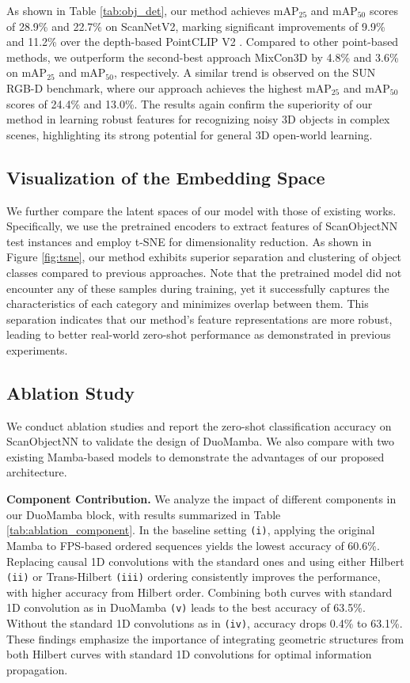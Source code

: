 As shown in Table \ref{tab:obj_det}, our method achieves mAP$_{25}$ and mAP$_{50}$ scores of 28.9\% and 22.7\% on ScanNetV2, marking significant improvements of 9.9\% and 11.2\% over the depth-based PointCLIP V2 \cite{pointclipv2}. Compared to other point-based methods, we outperform the second-best approach MixCon3D \cite{mixcon3d} by 4.8\% and 3.6\% on mAP$_{25}$ and mAP$_{50}$, respectively. A similar trend is observed on the SUN RGB-D benchmark, where our approach achieves the highest mAP$_{25}$ and mAP$_{50}$ scores of 24.4\% and 13.0\%.
The results again confirm the superiority of our method in learning robust features for recognizing noisy 3D objects in complex scenes, highlighting its strong potential for general 3D open-world learning.

\subsection{Visualization of the Embedding Space}
We further compare the latent spaces of our model with those of existing works. Specifically, we use the pretrained encoders to extract features of ScanObjectNN \cite{scanobjectnn} test instances and employ t-SNE \cite{tsne} for dimensionality reduction. As shown in Figure \ref{fig:tsne}, our method exhibits superior separation and clustering of object classes compared to previous approaches. Note that the pretrained model did not encounter any of these samples during training, yet it successfully captures the characteristics of each category and minimizes overlap between them. This separation indicates that our method’s feature representations are more robust, leading to better real-world zero-shot performance as demonstrated in previous experiments. 
\subsection{Ablation Study}
\label{subsec:ablation}
We conduct ablation studies and report the zero-shot classification accuracy on ScanObjectNN \cite{scanobjectnn} to validate the design of DuoMamba.
We also compare with two existing Mamba-based models to demonstrate the advantages of our proposed architecture.

\vspace{1mm} 
\noindent\textbf{Component Contribution.} We analyze the impact of different components in our DuoMamba block, with results summarized in Table \ref{tab:ablation_component}. In the baseline setting \texttt{(i)}, applying the original Mamba \cite{mamba} to FPS-based ordered sequences yields the lowest accuracy of 60.6\%. Replacing causal 1D convolutions with the standard ones and using either Hilbert \texttt{(ii)} or Trans-Hilbert \texttt{(iii)} ordering consistently improves the performance, with higher accuracy from Hilbert order. Combining both curves with standard 1D convolution as in DuoMamba \texttt{(v)} leads to the best accuracy of 63.5\%. Without the standard 1D convolutions as in \texttt{(iv)}, accuracy drops 0.4\% to 63.1\%. These findings emphasize the importance of integrating geometric structures from both Hilbert curves with standard 1D convolutions for optimal information propagation.

